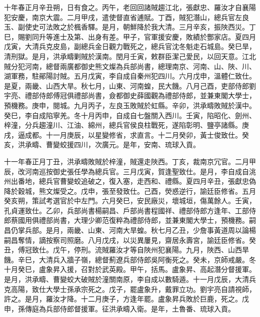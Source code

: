 \begin{pinyinscope}
十年春正月辛丑朔，日有食之。丙午，老回回諸賊趨江北，張獻忠、羅汝才自襄陽犯安慶，南京大震。二月甲戌，遣使督直省逋賦。丁酉，賊犯潛山，總兵官左良玉、副使史可法敗之於楓香驛。是月，朝鮮降於我大清。三月辛亥，振陜西災。丁巳，賜劉同升等進士及第、出身有差。甲子，官軍援安慶，敗績於酆家店。夏四月戊寅，大清兵克皮島，副總兵金日觀力戰死之，總兵官沈冬魁走石城島。癸巳旱，清刑獄。是月，洪承疇剿賊於漢南。閏月壬寅，敕群臣潔己愛民，以回天意。江北賊分犯河南，總督兩廣都御史熊文燦為兵部尚書，總理南京、河南、山、陜、川、湖軍務，駐鄖陽討賊。五月戊寅，李自成自秦州犯四川。六月戊申，溫體仁致仕。是夏，兩畿、山西大旱。秋七月，山東、河南蝗，民大饑。八月己酉，吏部侍郎劉宇亮、禮部侍郎傅冠俱禮部尚書，僉都御史薛國觀為禮部侍郎，並兼東閣大學士，預機務。庚申，閱城。九月丙子，左良玉敗賊於虹縣。辛卯，洪承疇敗賊於漢中。癸巳，李自成陷寧羌。冬十月丙申，自成自七盤關入西川。壬寅，陷昭化、劍州、梓潼，分兵趨潼川、江油、綿州，總兵官侯良柱戰死，遂陷彰明、鹽亭諸縣。庚戌，逼成都。十一月庚辰，以星變修省，求直言。十二月癸卯，黃士俊致仕。癸亥，洪承疇、曹變蛟援四川，次廣元。是年，安南、琉球入貢。

十一年春正月丁丑，洪承疇敗賊於梓潼，賊還走陜西。丁亥，裁南京冗官。二月甲辰，改河南巡按御史張任學為總兵官。三月戊寅，賀逢聖致仕。是月，李自成自洮州出番地，總兵官曹變蛟追破之，復入塞，走西和、禮縣。夏四月辛丑，張獻忠偽降於穀城，熊文燦受之。戊申，張至發致仕。己酉，熒惑逆行，諭廷臣修省。五月癸亥朔，策試考選官於中左門。六月癸巳，安民廠災，壞城垣，傷萬餘人。壬寅，孔貞運致仕。乙卯，兵部尚書楊嗣昌、戶部尚書程國祥、禮部侍郎方逢年、工部侍郎蔡國用俱禮部尚書，大理少卿范復粹為禮部侍郎，並兼東閣大學士，預機務。嗣昌仍掌兵部。是月，兩畿、山東、河南大旱蝗。秋七月乙丑，少詹事黃道周以論楊嗣昌奪情，謫按察司照磨。八月戊戌，以災異屢見，齋居永壽宮，諭廷臣修省。癸丑，傅冠致仕。戊午，停刑。流賊羅汝才等自陜州犯襄陽。九月，陜西、山西旱饑。辛巳，大清兵入牆子嶺，總督薊遼兵部侍郎吳阿衡死之。癸未，京師戒嚴。冬十月癸巳，盧象昇入援，召對於武英殿。甲午，括馬。盧象昇、高起潛分督援軍。是月，洪承疇、曹變蛟大破賊於潼關南原，李自成以數騎遁。十一月戊辰，大清兵克高陽，致仕大學士孫承宗死之。戊子，罷盧象升，戴罪立功。劉宇亮自請視師，許之。是月，羅汝才降。十二月庚子，方逢年罷。盧象昇兵敗於巨鹿，死之。戊申，孫傳庭為兵部侍郎督援軍。征洪承疇入衛。是年，土魯番、琉球入貢。


\end{pinyinscope}
